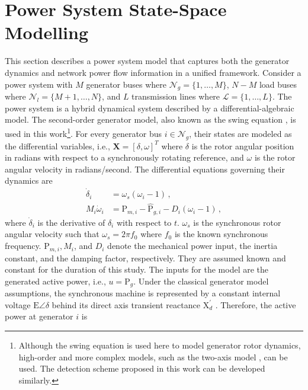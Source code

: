 \section{Power System State-Space Modelling}
\label{ch4:sec:power_model}
This section describes a power system model that captures both the generator dynamics and network power flow information in a unified framework. Consider a power system with $M$ generator buses where $\mathcal{N}_g = \{1, \dots, M\}$, $N-M$ load buses where $\mathcal{N}_l = \{M+1, \dots, N\}$, and $L$ transmission lines where $\mathcal{L} = \{1, \dots, L\}$. 
The power system is a hybrid dynamical system described by a differential-algebraic model. The second-order generator model, also known as the swing equation \cite{Kundur1994}, is used in this work\footnote{Although the swing equation is used here to model generator rotor dynamics, high-order and more complex models, such as the two-axis model \cite{sauer2017power}, can be used. The detection scheme proposed in this work can be developed similarly.}.
For every generator bus $i \in \mathcal{N}_g$, their states are modeled as the differential variables, i.e., $\boldsymbol{X}= [\delta, \omega]^T$ where $\delta$ is the rotor angular position in radians with respect to a synchronously rotating reference, and $\omega$ is the rotor angular velocity in radians/second. The differential equations governing their dynamics are
\begin{subequations}
\label{ch4:eqn:de_continuous}
\begin{align}
\dot{\delta}_{i} &=\omega_s\left(\omega_{i}-1\right) \,, \label{ch4:eqn:transition_function_delta}\\
M_i \dot{\omega}_{i} &=\text{P}_{m, i}-\hat{\text{P}}_{g, i}-D_i\left(\omega_{i}-1\right) \,, \label{ch4:eqn:transition_function_omega}
\end{align}
\end{subequations}
where $\dot{\delta}_{i}$ is the derivative of $\delta_i$ with respect to $t$. $\omega_s$ is the synchronous rotor angular velocity such that $\omega_s= 2 \pi f_{0}$ where $f_0$ is the known synchronous frequency. $\text{P}_{m,i}, M_i$, and $D_i$ denote the mechanical power input, the inertia constant, and the damping factor, respectively. They are assumed known and constant for the duration of this study. The inputs for the model are the generated active power, i.e., ${u}= \text{P}_{g}$. Under the classical generator model assumptions, the synchronous machine is represented by a constant internal voltage $\text{E}\angle\delta$ behind its direct axis transient reactance $\text{X}_{{d}}^{\prime}$ \cite{Kundur1994}. Therefore, the active power at generator $i$ is
